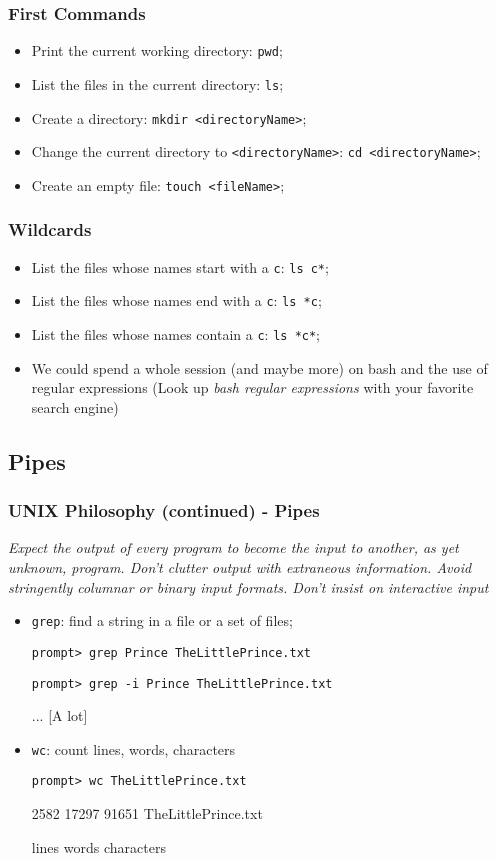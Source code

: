 \documentclass[utf8x,10pt]{beamer}
\begin{document}
\begin{frame}
  \frametitle{First Commands}

  \begin{itemize}
  \item Print the current working directory: \texttt{pwd};
  \item List the files in the current directory: \texttt{ls};
  \item Create a directory: \texttt{mkdir <directoryName>};
  \item Change the current directory to \texttt{<directoryName>}:
    \texttt{cd <directoryName>};
  \item Create an empty file: \texttt{touch <fileName>};
  \end{itemize}
\end{frame}

\begin{frame}
  \frametitle{Wildcards}
  \begin{itemize}
  \item List the files whose names start with a \texttt{c}: \texttt{ls
      c*};
  \item List the files whose names end with a \texttt{c}: \texttt{ls
      *c};
  \item List the files whose names contain a \texttt{c}: \texttt{ls
      *c*};
  \item We could spend a whole session (and maybe more) on bash and
    the use of regular expressions (Look up \emph{bash regular
      expressions} with your favorite search engine)
  \end{itemize}
\end{frame}

\subsection{Pipes}
\begin{frame}
  \frametitle{UNIX Philosophy (continued) - Pipes}

  \emph{Expect the output of every program to become the input to
    another, as yet unknown, program. Don't clutter output with
    extraneous information. Avoid stringently columnar or binary input
    formats. Don't insist on interactive input}

  \begin{itemize}
  \item \texttt{grep}: find a string in a file or a set of files;

    \texttt{prompt> grep Prince TheLittlePrince.txt}

    \texttt{prompt> grep -i Prince TheLittlePrince.txt}

    ... [A lot]

  \item \texttt{wc}: count lines, words, characters

    \texttt{prompt> wc TheLittlePrince.txt}

    2582 17297 91651 TheLittlePrince.txt

    lines words characters
  \end{itemize}
\end{frame}
\end{document}
